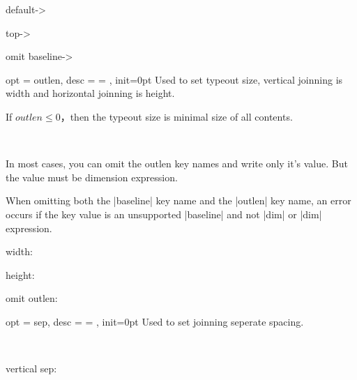 \documentclass[full]{l3doc}
\begin{document}
\begin{documentation}
\begin{SideBySideExample}[frame=single,numbers=left,xrightmargin=.45\linewidth,gobble=2]
  default->

  top->

  omit baseline->
\end{SideBySideExample}

\bigskip

\begin{option}{ opt = outlen, desc = {= }, init=0pt }
  Used to set typeout size, vertical joinning is width and horizontal joinning is height.

  If $outlen\le 0$，then the typeout size is minimal size of all contents.
\end{option}\\
\begin{noteen}
  In most cases, you can omit the outlen key names and write only it's value. 
  But the value must be dimension expression.

  When omitting both the |baseline| key name and the |outlen| key name,
  an error occurs if the key value is an unsupported |baseline| and
  not |dim| or |dim| expression.
\end{noteen}

\begin{SideBySideExample}[frame=single,numbers=left,xrightmargin=.45\linewidth,gobble=2]
  width: 

  height: 

  omit outlen: 
\end{SideBySideExample}

\bigskip

\begin{option}{ opt = sep, desc = {= }, init=0pt }
  Used to set joinning seperate spacing.
\end{option}\\
\begin{SideBySideExample}[frame=single,numbers=left,xrightmargin=.45\linewidth,gobble=2]
  vertical sep: 


\end{SideBySideExample}
\end{documentation}
\end{document}
